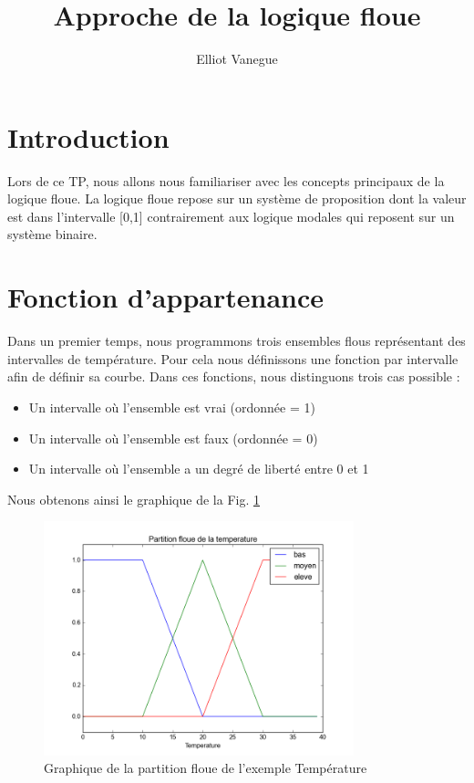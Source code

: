\documentclass[a4paper,11pt]{article}
\title{Approche de la logique floue}
\author{Elliot Vanegue}
\begin{document}
\maketitle

\section{Introduction}
Lors de ce TP, nous allons nous familiariser avec les concepts principaux de la logique floue.
La logique floue repose sur un système de proposition dont la valeur est dans l'intervalle [0,1] contrairement aux logique
modales qui reposent sur un système binaire. 

\section{Fonction d'appartenance}
Dans un premier temps, nous programmons trois ensembles flous représentant des intervalles de température.
Pour cela nous définissons une fonction par intervalle afin de définir sa courbe. Dans ces fonctions, nous 
distinguons trois cas possible :
\begin{itemize}
  \item Un intervalle où l'ensemble est vrai (ordonnée = 1)
  \item Un intervalle où l'ensemble est faux (ordonnée = 0)
  \item Un intervalle où l'ensemble a un degré de liberté entre 0 et 1
\end{itemize}
Nous obtenons ainsi le graphique de la Fig. \ref{fig:GraphiqueFlou} 

\begin{figure}[!h]
  \begin{center}
    \includegraphics[width=9cm]{tempFlou.png}
    \caption{Graphique de la partition floue de l'exemple \og Température \fg}
    \label{fig:GraphiqueFlou}
  \end{center}
\end{figure}
\end{document}
